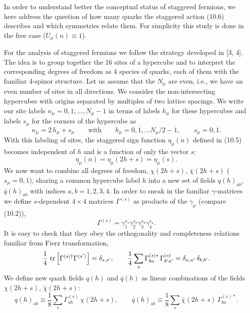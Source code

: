 In order to understand better the conceptual status of staggered fermions, we
here address the question of how many quarks the staggered action (10.6)
describes and which symmetries relate them. For simplicity this study is done
in the free case ($U_\mu(n) \equiv 1$).

For the analysis of staggered fermions we follow the strategy developed in
[3, 4]. The idea is to group together the 16 sites of a hypercube and to
interpret the corresponding degrees of freedom as 4 species of quarks, each of
them with the familiar 4-spinor structure. Let us assume that the $N_\mu$ are
even, i.e., we have an even number of sites in all directions. We consider
the non-intersecting hypercubes with origins separated by multiples of two
lattice spacings. We write our site labels $n_\mu = 0, 1, \ldots, N_\mu - 1$
in terms of labels $h_\mu$ for these hypercubes and labels $s_\mu$ for the
corners of the hypercube as
\begin{equation}
  n_\mu = 2\,h_\mu + s_\mu
  \qquad \text{with} \qquad
  h_\mu = 0, 1, \ldots N_\mu/2 - 1 , \qquad
  s_\mu = 0, 1 .
\end{equation}
With this labeling of sites, the staggered sign function $\eta_\mu(n)$ defined
in (10.5) becomes independent of $h$ and is a function of only the vector $s$:
\begin{equation}
  \eta_\mu(n) = \eta_\mu(2h + s) = \eta_\mu(s) .
\end{equation}
We now want to combine all degrees of freedom, $\chi(2h+s)$, $\bar\chi(2h+s)$
($s_\mu = 0, 1$), sharing a common hypercube label $h$ into a new set of
fields $q(h)_{ab}$, $\bar q(h)_{ab}$ with indices $a, b = 1, 2, 3, 4$. In
order to sneak in the familiar $\gamma$-matrices we define $s$-dependent
$4\times 4$ matrices $\Gamma^{(s)}$ as products of the $\gamma_\mu$ (compare
(10.2)),
\begin{equation}
  \Gamma^{(s)} = \gamma_1^{s_1}\gamma_2^{s_2}\gamma_3^{s_3}\gamma_4^{s_4} .
\end{equation}
It is easy to check that they obey the orthogonality and completeness
relations familiar from Fierz transformation,
\begin{equation}
  \frac{1}{4}\,\operatorname{tr}\left[\Gamma^{(s)\dagger}\Gamma^{(s')}\right]
  = \delta_{s,s'} , \qquad
  \frac{1}{4}\sum_s \Gamma^{(s)*}_{ba}\,\Gamma^{(s)}_{b'a'}
  = \delta_{a,a'}\,\delta_{b,b'} .
\end{equation}
We define new quark fields $q(h)$ and $\bar q(h)$ as linear combinations of
the fields $\chi(2h+s)$, $\bar\chi(2h+s)$:
\begin{equation}
  q(h)_{ab} \equiv \frac{1}{8}\sum_s \Gamma^{(s)}_{ab}\,\chi(2h+s) , \qquad
  \bar q(h)_{ab} \equiv \frac{1}{8}\sum_s
  \bar\chi(2h+s)\,\Gamma^{(s)*}_{ba} .
\end{equation}
